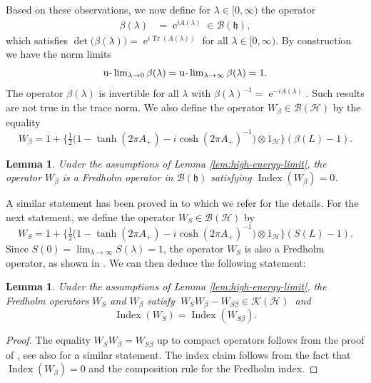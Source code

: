 \documentclass{article}
\def\B{\mathscr B}
\def\H{\mathcal H}
\def\K{\mathscr K}
\def\Hrond{\mathscr H}
\def\HS{\mathfrak h}
\def\e{\mathop{\mathrm{e}}\nolimits}
\def\ulim{\mathop{\hbox{\rm u-}\lim}\nolimits}
\def\index{\mathop{\mathrm{Index}}\nolimits}
\def\Tr{\mathop{\mathrm{Tr}}\nolimits}
\newtheorem{Lemma}[Theorem]{Lemma}
\begin{document}
Based on these observations, we now define for $\lambda \in [0,\infty)$ the operator
\begin{align*}
\beta(\lambda) &= \e^{i A(\lambda)} \in \B(\HS),
\end{align*}
which satisfies $\det\big(\beta(\lambda)\big) = \e^{i \Tr(A(\lambda))}$ for all $\lambda \in [0,\infty)$. 
By construction we have the norm limits 
$$
\ulim_{\lambda \to 0} \beta(\lambda) = \ulim_{\lambda \to \infty} \beta(\lambda) = 1.
$$
The operator $\beta(\lambda)$ is invertible for all $\lambda$ with $\beta(\lambda)^{-1} = \e^{-i A(\lambda)}$. Such results are not true in the trace norm. We also define the operator $W_\beta \in \B(\Hrond)$ by the equality
\begin{equation*}
W_\beta = 1+ \big\{\tfrac12\big(1-\tanh(2\pi A_+)-i\cosh(2\pi A_+)^{-1}\big)\otimes1_{\H}\big\}(\beta(L)-1).
\end{equation*}

\begin{Lemma}\label{lem_Wb}
Under the assumptions of Lemma \ref{lem:high-energy-limit}, the operator $W_\beta$ is a Fredholm operator in $\B(\HS)$ 
satisfying $\index(W_\beta) = 0$.
\end{Lemma}

A similar statement has been proved in \cite[Lem.~5.7]{ANRR} to which we refer for the details. 
For the next statement, we define the operator $W_S \in \B(\Hrond)$ by
\begin{equation*}
W_S = 1+ \big\{\tfrac12\big(1-\tanh(2\pi A_+)-i\cosh(2\pi A_+)^{-1}\big)\otimes1_{\H}\big\} (S(L)-1).
\end{equation*}
Since $S(0) = \lim_{\lambda \to \infty}S(\lambda)=1$, the operator $W_S$ is also 
a Fredholm operator, as shown in \cite[Lem.~5.4]{ANRR}.
We can then deduce the following statement:

\begin{Lemma}\label{lem:equal-index}
Under the assumptions of Lemma \ref{lem:high-energy-limit},
the Fredholm operators $W_S$ and $W_\beta$ satisfy
$\ W_S W_{\beta} - W_{S\beta}  \in \K(\Hrond)\ $
and
$$
\index(W_S) = \index(W_{S\beta}).
$$ 
\end{Lemma}

\begin{proof}
The equality $W_S W_\beta = W_{S\beta}$ up to compact operators follows from the proof of \cite[Lem.~3.4]{Angus}, see also \cite[Lem.~5.8]{ANRR} for a similar statement.
The index claim follows from the fact that $\index(W_\beta) = 0$ and the composition rule for the Fredholm index.
\end{proof}
\end{document}
